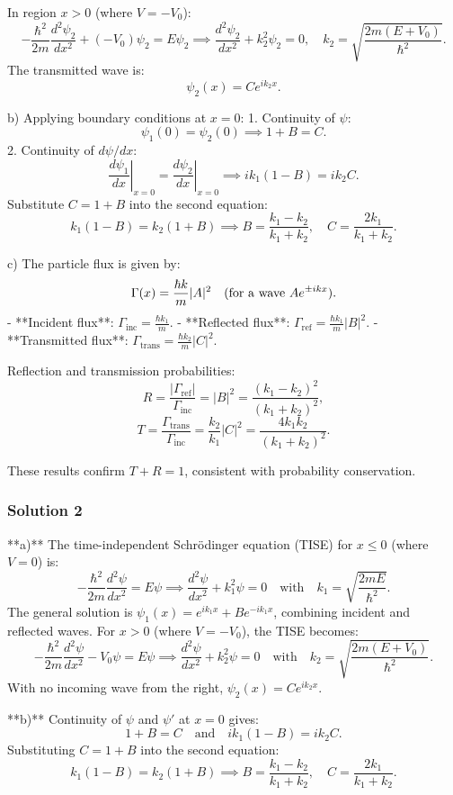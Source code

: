 \documentclass{article}
\begin{document}
In region \( x > 0 \) (where \( V = -V_0 \)):
\[
-\frac{\hbar^2}{2m} \frac{d^2 \psi_2}{dx^2} + (-V_0)\psi_2 = E \psi_2 \implies \frac{d^2 \psi_2}{dx^2} + k_2^2 \psi_2 = 0, \quad k_2 = \sqrt{\frac{2m(E + V_0)}{\hbar^2}}.
\]
The transmitted wave is:
\[
\psi_2(x) = C e^{ik_2x}.
\]

b) Applying boundary conditions at \( x = 0 \):
1. Continuity of \( \psi \):
\[
\psi_1(0) = \psi_2(0) \implies 1 + B = C.
\]
2. Continuity of \( d\psi/dx \):
\[
\left. \frac{d\psi_1}{dx} \right|_{x=0} = \left. \frac{d\psi_2}{dx} \right|_{x=0} \implies ik_1(1 - B) = ik_2 C.
\]
Substitute \( C = 1 + B \) into the second equation:
\[
k_1(1 - B) = k_2(1 + B) \implies B = \frac{k_1 - k_2}{k_1 + k_2}, \quad C = \frac{2k_1}{k_1 + k_2}.
\]

c) The particle flux is given by:
\[
\Gamma(x) = \frac{\hbar k}{m} |A|^2 \quad \text{(for a wave \( A e^{\pm ikx} \))}.
\]
- **Incident flux**: \( \Gamma_{\text{inc}} = \frac{\hbar k_1}{m} \).
- **Reflected flux**: \( \Gamma_{\text{ref}} = \frac{\hbar k_1}{m} |B|^2 \).
- **Transmitted flux**: \( \Gamma_{\text{trans}} = \frac{\hbar k_2}{m} |C|^2 \).

Reflection and transmission probabilities:
\[
R = \frac{|\Gamma_{\text{ref}}|}{\Gamma_{\text{inc}}} = |B|^2 = \frac{(k_1 - k_2)^2}{(k_1 + k_2)^2},
\]
\[
T = \frac{\Gamma_{\text{trans}}}{\Gamma_{\text{inc}}} = \frac{k_2}{k_1} |C|^2 = \frac{4k_1k_2}{(k_1 + k_2)^2}.
\]

These results confirm \( T + R = 1 \), consistent with probability conservation.

\subsubsection{Solution 2}
**a)** The time-independent Schrödinger equation (TISE) for \(x \leq 0\) (where \(V = 0\)) is:
\[
-\frac{\hbar^2}{2m} \frac{d^2\psi}{dx^2} = E\psi \implies \frac{d^2\psi}{dx^2} + k_1^2\psi = 0 \quad \text{with} \quad k_1 = \sqrt{\frac{2mE}{\hbar^2}}.
\]
The general solution is \(\psi_1(x) = e^{ik_1x} + Be^{-ik_1x}\), combining incident and reflected waves. For \(x > 0\) (where \(V = -V_0\)), the TISE becomes:
\[
-\frac{\hbar^2}{2m} \frac{d^2\psi}{dx^2} - V_0\psi = E\psi \implies \frac{d^2\psi}{dx^2} + k_2^2\psi = 0 \quad \text{with} \quad k_2 = \sqrt{\frac{2m(E + V_0)}{\hbar^2}}.
\]
With no incoming wave from the right, \(\psi_2(x) = Ce^{ik_2x}\).

**b)** Continuity of \(\psi\) and \(\psi'\) at \(x = 0\) gives:
\[
1 + B = C \quad \text{and} \quad ik_1(1 - B) = ik_2C.
\]
Substituting \(C = 1 + B\) into the second equation:
\[
k_1(1 - B) = k_2(1 + B) \implies B = \frac{k_1 - k_2}{k_1 + k_2}, \quad C = \frac{2k_1}{k_1 + k_2}.
\]
\end{document}
